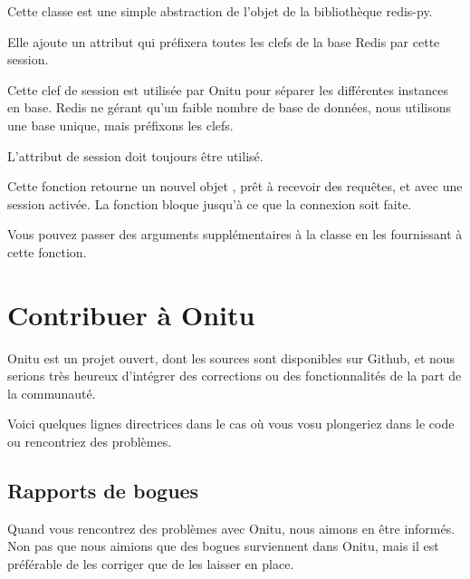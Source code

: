 \documentclass[letterpaper,10pt,english]{sphinxmanual}
\begin{document}
\begin{fulllineitems}
\label{components:onitu.utils.Redis}
Cette classe est une simple abstraction de l'objet  de la bibliothèque redis-py.

Elle ajoute un attribut  qui préfixera toutes les clefs de la base Redis par cette session.

Cette clef de session est utilisée par Onitu pour séparer les différentes instances en base. Redis ne gérant qu'un faible nombre de base de données, nous utilisons une base unique, mais préfixons les clefs.

L'attribut de session doit toujours être utilisé.

\end{fulllineitems}


\begin{fulllineitems}
\label{components:onitu.utils.connect_to_redis}
Cette fonction retourne un nouvel objet {\hyperref[components:onitu.utils.Redis]{}}, prêt à recevoir des requêtes, et avec une session activée. La fonction bloque jusqu'à ce que la connexion soit faite.

Vous pouvez passer des arguments supplémentaires à la classe {\hyperref[components:onitu.utils.Redis]{}} en les fournissant à cette fonction.

\end{fulllineitems}



\section{Contribuer à Onitu}
\label{contribute:contributing-to-onitu}\label{contribute::doc}
Onitu est un projet ouvert, dont les sources sont disponibles sur Github, et nous serions très heureux d'intégrer des corrections ou des fonctionnalités de la part de la communauté.

Voici quelques lignes directrices dans le cas où vous vosu plongeriez dans le code ou rencontriez des problèmes.


\subsection{Rapports de bogues}
\label{contribute:reporting-issues}
Quand vous rencontrez des problèmes avec Onitu, nous aimons en être informés. Non pas que nous aimions que des bogues surviennent dans Onitu, mais il est préférable de les corriger que de les laisser en place.
\end{document}
